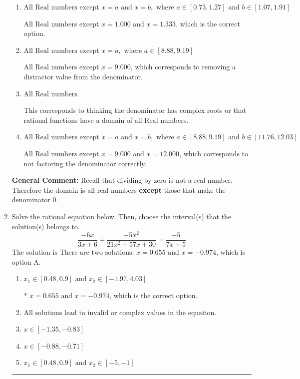 \documentclass{extbook}[14pt]
\newcommand{\litem}[1]{\item #1

\rule{\textwidth}{0.4pt}}
\begin{document}
\begin{enumerate}
{\begin{enumerate}[label=\Alph*.]
All Real numbers except $x = 1.000$, which corresponds to removing only 1 value from the denominator.
\item \( \text{All Real numbers except } x = a \text{ and } x = b, \text{ where } a \in [0.73, 1.27] \text{ and } b \in [1.07, 1.91] \)

All Real numbers except $x = 1.000$ and $x = 1.333$, which is the correct option.
\item \( \text{All Real numbers except } x = a, \text{ where } a \in [8.88, 9.19] \)

All Real numbers except $x = 9.000$, which corresponds to removing a distractor value from the denominator.
\item \( \text{All Real numbers.} \)

This corresponds to thinking the denominator has complex roots or that rational functions have a domain of all Real numbers.
\item \( \text{All Real numbers except } x = a \text{ and } x = b, \text{ where } a \in [8.88, 9.19] \text{ and } b \in [11.76, 12.03] \)

All Real numbers except $x = 9.000$ and $x = 12.000$, which corresponds to not factoring the denominator correctly.
\end{enumerate}

\textbf{General Comment:} Recall that dividing by zero is not a real number. Therefore the domain is all real numbers \textbf{except} those that make the denominator 0.
}
\litem{
Solve the rational equation below. Then, choose the interval(s) that the solution(s) belongs to.
\[ \frac{-6x}{3x + 6} + \frac{-5x^{2}}{21x^{2} +57 x + 30} = \frac{-5}{7x + 5} \]The solution is \( \text{There are two solutions: } x = 0.655 \text{ and } x = -0.974 \), which is option A.\begin{enumerate}[label=\Alph*.]
\item \( x_1 \in [0.48, 0.9] \text{ and } x_2 \in [-1.97,4.03] \)

* $x = 0.655 \text{ and } x = -0.974$, which is the correct option.
\item \( \text{All solutions lead to invalid or complex values in the equation.} \)


\item \( x \in [-1.35,-0.83] \)


\item \( x \in [-0.88,-0.71] \)


\item \( x_1 \in [0.48, 0.9] \text{ and } x_2 \in [-5,-1] \)



\end{enumerate}}
\end{enumerate}
\end{document}
